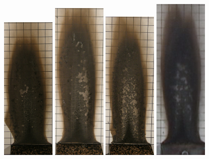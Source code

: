 \documentclass[twoside]{uocthesis}
\begin{document}
\begin{figure}[p]
	\includegraphics[width=1.0in]{../Figures/GBNG29_P5130436}
	\includegraphics[width=1.0in]{../Figures/GBNG30_P5130445}
	\includegraphics[width=1.0in]{../Figures/GBNG31_P5130449}
	\includegraphics[width=1.0in]{../Figures/GBNG32}

\end{figure}
\end{document}
